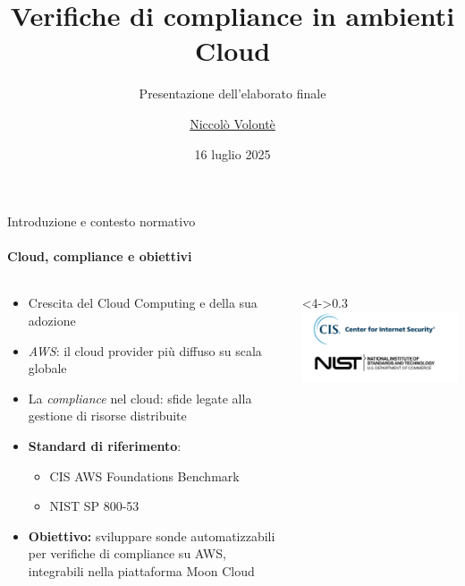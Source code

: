 \documentclass{beamer}
\title{Verifiche di compliance in ambienti Cloud}
\subtitle{Presentazione dell'elaborato finale}
\author{\href{mailto:niccolo.volonte@studenti.unimi.it}{Niccolò Volontè}}
\date{16 luglio 2025}
\begin{document}
\maketitle




\begin{frame}{Introduzione e contesto normativo}
    \framesubtitle{Cloud, compliance e obiettivi}
    \begin{columns}
        \begin{column}{0.7\textwidth}
                \begin{itemize}
                    \item<1-> Crescita del Cloud Computing e della sua adozione
                    \item<2-> \emph{AWS}: il cloud provider più diffuso su scala globale
                    \item<3-> La \emph{compliance} nel cloud: sfide legate alla gestione di risorse distribuite
                    \item<4-> \textbf{Standard di riferimento}:
                    \begin{itemize}
                        \item CIS AWS Foundations Benchmark
                        \item NIST SP 800-53
                    \end{itemize}
                    \item<5-> \textbf{Obiettivo:} sviluppare sonde automatizzabili per verifiche di compliance su AWS, integrabili nella piattaforma Moon Cloud
                \end{itemize}
        \end{column}
        \begin{column}<4->{0.3\textwidth}
            \includegraphics[width=\textwidth]{assets/cisnist.png}
        \end{column}
    \end{columns}
\end{frame}
\end{document}
